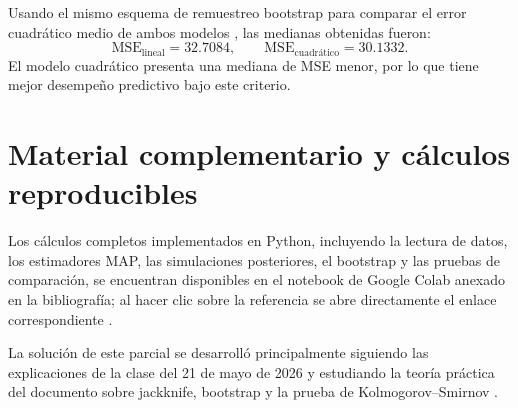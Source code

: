 \documentclass[a4paper]{article}
\begin{document}
\begin{enumerate}[a)]
Usando el mismo esquema de remuestreo bootstrap para comparar el error cuadrático medio de ambos modelos \cite{press1992}, las medianas obtenidas fueron:
\begin{equation}
  \mathrm{MSE}_{\text{lineal}} = 32.7084, \qquad
  \mathrm{MSE}_{\text{cuadrático}} = 30.1332.
\end{equation}
El modelo cuadrático presenta una mediana de MSE menor, por lo que tiene
mejor desempeño predictivo bajo este criterio.

\end{enumerate}

\section{Material complementario y cálculos reproducibles}

Los cálculos completos implementados en Python, incluyendo la lectura de datos,
los estimadores MAP, las simulaciones posteriores, el bootstrap y las pruebas de
comparación, se encuentran disponibles en el notebook de Google Colab anexado en
la bibliografía; al hacer clic sobre la referencia se abre directamente el enlace
correspondiente \cite{colab_parcial3_solucion}.

La solución de este parcial se desarrolló principalmente siguiendo las
explicaciones de la clase del 21 de mayo de 2026 \cite{clase_20260521} y
estudiando la teoría práctica del documento sobre jackknife, bootstrap y la
prueba de Kolmogorov--Smirnov \cite{jackknife_bootstrap_ks}.


 
\end{document}
